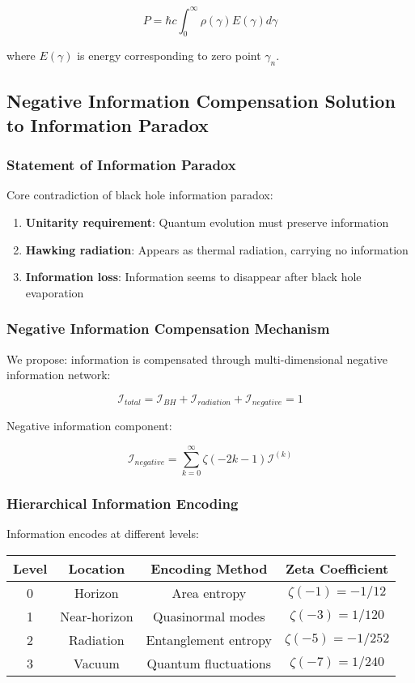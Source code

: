 \documentclass[12pt,a4paper]{article}
\begin{document}
$$P = \hbar c \int_0^\infty \rho(\gamma) E(\gamma) d\gamma$$

where $E(\gamma)$ is energy corresponding to zero point $\gamma_n$.

\subsection{Negative Information Compensation Solution to Information Paradox}

\subsubsection{Statement of Information Paradox}

Core contradiction of black hole information paradox:

\begin{enumerate}
\item \textbf{Unitarity requirement}: Quantum evolution must preserve information
\item \textbf{Hawking radiation}: Appears as thermal radiation, carrying no information
\item \textbf{Information loss}: Information seems to disappear after black hole evaporation
\end{enumerate}

\subsubsection{Negative Information Compensation Mechanism}

We propose: information is compensated through multi-dimensional negative information network:

$$\mathcal{I}_{total} = \mathcal{I}_{BH} + \mathcal{I}_{radiation} + \mathcal{I}_{negative} = 1$$

Negative information component:

$$\mathcal{I}_{negative} = \sum_{k=0}^{\infty} \zeta(-2k-1) \mathcal{I}^{(k)}$$

\subsubsection{Hierarchical Information Encoding}

Information encodes at different levels:

\begin{center}
\begin{tabular}{|c|c|c|c|}
\hline
Level & Location & Encoding Method & Zeta Coefficient \\
\hline
0 & Horizon & Area entropy & $\zeta(-1) = -1/12$ \\
1 & Near-horizon & Quasinormal modes & $\zeta(-3) = 1/120$ \\
2 & Radiation & Entanglement entropy & $\zeta(-5) = -1/252$ \\
3 & Vacuum & Quantum fluctuations & $\zeta(-7) = 1/240$ \\
\hline
\end{tabular}
\end{center}
\end{document}
